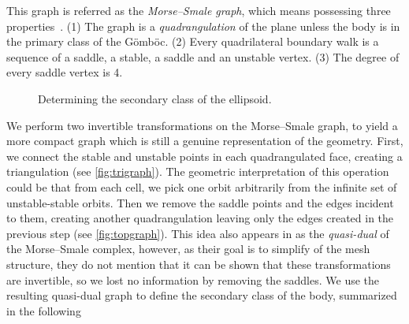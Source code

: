 \documentclass[]{article}
\newcommand{\Gomboc}{Gömböc\xspace}
\begin{document}
This graph is referred as the \emph{Morse--Smale graph}, which means possessing three properties~\cite{Arnold1978,Edelsbrunner2001}.
(1) The graph is a \emph{quadrangulation} of the plane unless the body is in the primary class of the \Gomboc.
(2) Every quadrilateral boundary walk is a sequence of a saddle, a stable, a saddle and an unstable vertex.
(3) The degree of every saddle vertex is 4.

\begin{figure}
\centering
{}
\caption{Determining the secondary class of the ellipsoid.
}
  \label{fig:subclass}
\end{figure}

We perform two invertible transformations on the Morse--Smale graph, to yield a more compact graph which is still a genuine representation of the geometry.
First, we connect the stable and unstable points in each quadrangulated face, creating a triangulation (see \autoref{fig:trigraph}).
The geometric interpretation of this operation could be that from each cell, we pick one orbit arbitrarily from the infinite set of unstable-stable orbits.
Then we remove the saddle points and the edges incident to them, creating another quadrangulation leaving only the edges created in the previous step (see \autoref{fig:topgraph}).
This idea also appears in \cite{Dong2006} as the \emph{quasi-dual} of the Morse--Smale complex, however, as their goal is to simplify of the mesh structure, they do not mention that it can be shown that these transformations are invertible, so we lost no information by removing the saddles.
We use the resulting quasi-dual graph to define the secondary class of the body, summarized in the following
\end{document}
